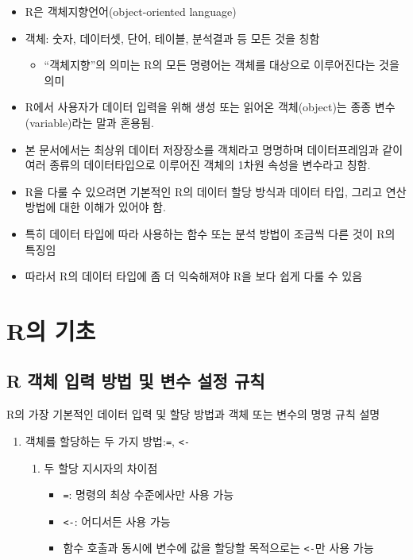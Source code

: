 \documentclass[11pt,a4paper]{book}
\providecommand{\tightlist}{%
  \setlength{\itemsep}{0pt}\setlength{\parskip}{0pt}}
\theoremstyle{definition}
\theoremstyle{definition}
\theoremstyle{definition}
\theoremstyle{remark}
\begin{document}
\begin{itemize}
\tightlist
\item
  R은 객체지향언어(object-oriented language)
\item
  객체: 숫자, 데이터셋, 단어, 테이블, 분석결과 등 모든 것을 칭함

  \begin{itemize}
  \tightlist
  \item
    ``객체지향''의 의미는 R의 모든 명령어는 객체를 대상으로 이루어진다는
    것을 의미
  \end{itemize}
\item
  R에서 사용자가 데이터 입력을 위해 생성 또는 읽어온 객체(object)는 종종
  변수(variable)라는 말과 혼용됨.
\item
  본 문서에서는 최상위 데이터 저장장소를 객체라고 명명하며
  데이터프레임과 같이 여러 종류의 데이터타입으로 이루어진 객체의 1차원
  속성을 변수라고 칭함.
\item
  R을 다룰 수 있으려면 기본적인 R의 데이터 할당 방식과 데이터 타입,
  그리고 연산 방법에 대한 이해가 있어야 함.
\item
  특히 데이터 타입에 따라 사용하는 함수 또는 분석 방법이 조금씩 다른
  것이 R의 특징임
\item
  따라서 R의 데이터 타입에 좀 더 익숙해져야 R을 보다 쉽게 다룰 수 있음
\end{itemize}

\section{R의 기초}\label{r-}

\subsection{R 객체 입력 방법 및 변수 설정 규칙}\label{r-------}

R의 가장 기본적인 데이터 입력 및 할당 방법과 객체 또는 변수의 명명 규칙
설명

\begin{enumerate}
\def\labelenumi{\arabic{enumi}.}
\tightlist
\item
  객체를 할당하는 두 가지 방법:\texttt{=}, \texttt{\textless{}-}

  \begin{enumerate}
  \def\labelenumii{\arabic{enumii})}
  \tightlist
  \item
    두 할당 지시자의 차이점

    \begin{itemize}
    \tightlist
    \item
      \texttt{=}: 명령의 최상 수준에사만 사용 가능
    \item
      \texttt{\textless{}-}: 어디서든 사용 가능
    \item
      함수 호출과 동시에 변수에 값을 할당할 목적으로는
      \texttt{\textless{}-}만 사용 가능
    \end{itemize}
  \end{enumerate}
\end{enumerate}
\end{document}
